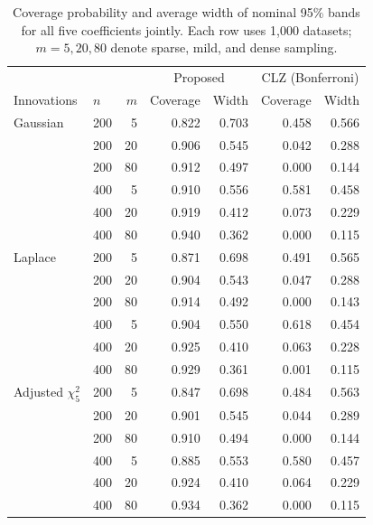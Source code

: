 \begin{table}[!tbp]
\centering
\caption{Coverage probability and average width of nominal 95\% bands for all five coefficients jointly. Each row uses 1,000 datasets; $m=5,20,80$ denote sparse, mild, and dense sampling.}
\label{tab:joint-new}
\renewcommand{\baselinestretch}{1.2}\small
\begin{tabular}{llrrrrr}
\toprule
& & & \multicolumn{2}{c}{Proposed} & \multicolumn{2}{c}{CLZ (Bonferroni)}\\
Innovations & $n$ & $m$ & Coverage & Width & Coverage & Width\\
\midrule
Gaussian & 200 & 5 & 0.822 & 0.703 & 0.458 & 0.566\\
 & 200 & 20 & 0.906 & 0.545 & 0.042 & 0.288\\
 & 200 & 80 & 0.912 & 0.497 & 0.000 & 0.144\\
 & 400 & 5 & 0.910 & 0.556 & 0.581 & 0.458\\
 & 400 & 20 & 0.919 & 0.412 & 0.073 & 0.229\\
 & 400 & 80 & 0.940 & 0.362 & 0.000 & 0.115\\
\midrule
Laplace & 200 & 5 & 0.871 & 0.698 & 0.491 & 0.565\\
 & 200 & 20 & 0.904 & 0.543 & 0.047 & 0.288\\
 & 200 & 80 & 0.914 & 0.492 & 0.000 & 0.143\\
 & 400 & 5 & 0.904 & 0.550 & 0.618 & 0.454\\
 & 400 & 20 & 0.925 & 0.410 & 0.063 & 0.228\\
 & 400 & 80 & 0.929 & 0.361 & 0.001 & 0.115\\
\midrule
Adjusted $\chi^2_5$ & 200 & 5 & 0.847 & 0.698 & 0.484 & 0.563\\
 & 200 & 20 & 0.901 & 0.545 & 0.044 & 0.289\\
 & 200 & 80 & 0.910 & 0.494 & 0.000 & 0.144\\
 & 400 & 5 & 0.885 & 0.553 & 0.580 & 0.457\\
 & 400 & 20 & 0.924 & 0.410 & 0.064 & 0.229\\
 & 400 & 80 & 0.934 & 0.362 & 0.000 & 0.115\\
\bottomrule
\end{tabular}
\end{table}
